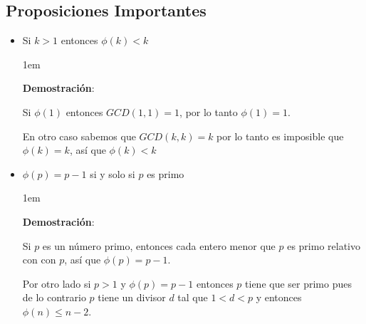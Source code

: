 \documentclass[12pt]{report}                                    %
\newenvironment{SmallIndentation}[1][0.75em]                    %
    {\begin{adjustwidth}{#1}{}\begin{footnotesize}}                 %
    {\end{footnotesize}\end{adjustwidth}}                           %
\begin{document}
        \subsection{Proposiciones Importantes}

            \begin{itemize}

                \item Si $k > 1$ entonces $\phi(k) < k$
                
                    \begin{SmallIndentation}[1em]
                        \textbf{Demostración}:

                        Si $\phi(1)$ entonces $GCD(1,1) = 1$, por lo tanto
                        $\phi(1)=1$.

                        En otro caso sabemos que $GCD(k, k) = k$ por lo tanto
                        es imposible que $\phi(k)=k$, así que $\phi(k) < k$

                    \end{SmallIndentation}


                \item $\phi(p) = p - 1$ si y solo si $p$ es primo

                    \begin{SmallIndentation}[1em]
                        \textbf{Demostración}:

                        Si $p$ es un número primo, entonces cada entero menor
                        que $p$ es primo relativo con con $p$, así que 
                        $\phi(p) = p-1$.

                        Por otro lado si $p>1$ y $\phi(p) = p-1$ entonces $p$
                        tiene que ser primo pues de lo contrario $p$ tiene
                        un divisor $d$ tal que $1<d<p$ y entonces
                        $\phi(n) \leq n-2$.

                    \end{SmallIndentation}

            \end{itemize}





\end{document}
